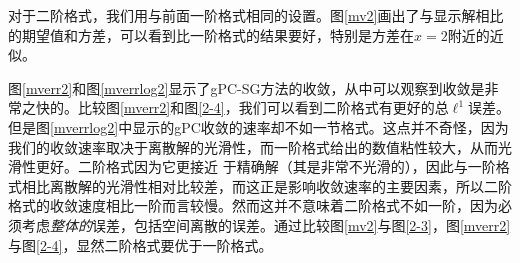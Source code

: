 
对于二阶格式，我们用与前面一阶格式相同的设置。图\ref{mv2}画出了与显示解相比的期望值和方差，可以看到比一阶格式的结果要好，特别是方差在$x = 2$附近的近似。

图\ref{mverr2}和图\ref{mverrlog2}显示了gPC-SG方法的收敛，从中可以观察到收敛是非常之快的。比较图\ref{mverr2}和图\ref{2-4}，我们可以看到二阶格式有更好的总$\ell^1$误差。但是图\ref{mverrlog2}中显示的gPC收敛的速率却不如一节格式。这点并不奇怪，因为我们的收敛速率取决于离散解的光滑性，而一阶格式给出的数值粘性较大，从而光滑性更好。二阶格式因为它更接近
于精确解（其是非常不光滑的），因此与一阶格式相比离散解的光滑性相对比较差，而这正是影响收敛速率的主要因素，所以二阶格式的收敛速度相比一阶而言较慢。然而这并不意味着二阶格式不如一阶，因为必须考虑{\it 整体的}误差，包括空间离散的误差。通过比较图\ref{mv2}与图\ref{2-3}，图\ref{mverr2}与图\ref{2-4}，显然二阶格式要优于一阶格式。
 

